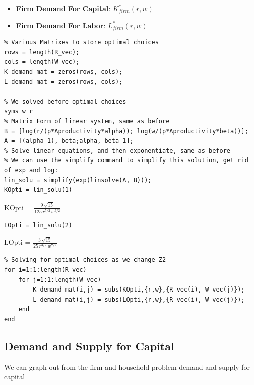 \documentclass[
]{book}
\begin{document}
\begin{itemize}
\item
  \textbf{Firm Demand For Capital}: \(K_{firm}^* (r,w)\)
\item
  \textbf{Firm Demand For Labor}: \(L_{firm}^* (r,w)\)
\end{itemize}

\begin{verbatim}
% Various Matrixes to store optimal choices
rows = length(R_vec);
cols = length(W_vec);
K_demand_mat = zeros(rows, cols);
L_demand_mat = zeros(rows, cols);

% We solved before optimal choices
syms w r
% Matrix Form of linear system, same as before
B = [log(r/(p*Aproductivity*alpha)); log(w/(p*Aproductivity*beta))];
A = [(alpha-1), beta;alpha, beta-1];
% Solve linear equations, and then exponentiate, same as before
% We can use the simplify command to simplify this solution, get rid of exp and log:
lin_solu = simplify(exp(linsolve(A, B)));
KOpti = lin_solu(1)
\end{verbatim}

KOpti = \(\displaystyle \frac{9\,\sqrt{15}}{125\,r^{5/2} \,w^{5/2} }\)

\begin{verbatim}
LOpti = lin_solu(2)
\end{verbatim}

LOpti = \(\displaystyle \frac{3\,\sqrt{15}}{25\,r^{3/2} \,w^{7/2} }\)

\begin{verbatim}
% Solving for optimal choices as we change Z2
for i=1:1:length(R_vec)
    for j=1:1:length(W_vec)
        K_demand_mat(i,j) = subs(KOpti,{r,w},{R_vec(i), W_vec(j)});
        L_demand_mat(i,j) = subs(LOpti,{r,w},{R_vec(i), W_vec(j)});
    end
end
\end{verbatim}

\hypertarget{demand-and-supply-for-capital}{%
\subsection{Demand and Supply for Capital}\label{demand-and-supply-for-capital}}

We can graph out from the firm and household problem demand and supply
for capital
\end{document}
